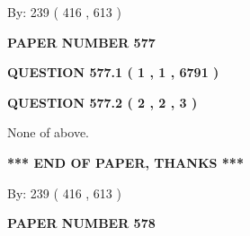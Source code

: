 \documentclass[12pt]{article}
\begin{document}
   
\hspace{1.0in} By: 
 239 ( 416 ,  613 )
   
   
   
   
\newpage 
\setcounter{page}{ 
   577001 } 
   
   
   
   
 {\textbf{ \Large{ PAPER NUMBER  577  }}}
   
   
\vspace{0.2in}
   
   
   
   
   
   
 \vspace{0.2in}
 
 
 
 
   
   
  
\vspace{0.2in}
  
{\textbf{\Large{QUESTION
577.1 
 ( 1 , 1 , 6791 )
}}}
  
  
  
\vspace{0.2in}
  
{\textbf{\Large{QUESTION
577.2 
 ( 2 , 2 , 3 )
}}}
  
  
 
 
\noindent{}
 
 
 None of above.
 
 
 
 
   
   
 \vspace{0.2in}
 
   
   
   
   
\vspace{1.0in} 
{\textbf{\large{ *** END OF PAPER, THANKS *** }}} 
   
   
\hspace{1.0in} By: 
 239 ( 416 ,  613 )
   
   
   
   
\newpage 
\setcounter{page}{ 
   578001 } 
   
   
   
   
 {\textbf{ \Large{ PAPER NUMBER  578  }}}
   
   
\vspace{0.2in}
   
\end{document}
